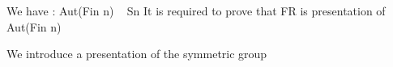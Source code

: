 We have : Aut(Fin n) ~ Sn
It is required to prove that 
    FR is presentation of Aut(Fin n)





We introduce a presentation of the symmetric group

